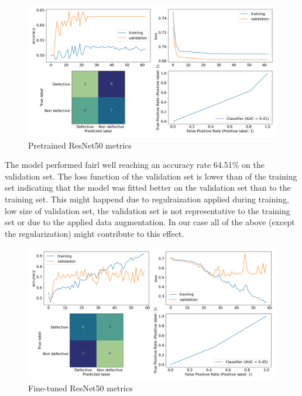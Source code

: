 \documentclass[10pt, final]{article}
\begin{document}
\begin{figure}[!ht]
	\centering
	\includegraphics[width=\textwidth]{./tex_graphs/metrics_ResNet50_pretrained.png}
	\caption{Pretrained ResNet50 metrics}
	\label{fig:ResNet50_pretrained_metrics}
\end{figure}

The model performed fairl well reaching an accuracy rate 64.51\% on the validation set.
The loss function of the validation set is lower than of the training set indicating that the model was fitted
better on the validation set than to the training set.
This might happend due to regulraization applied during training, low size of validation set, the validation set
is not representative to the training set or due to the applied data augmentation.
In our case all of the above (except the regularization) might contribute to this effect.

\begin{figure}[!ht]
	\centering
	\includegraphics[width=\textwidth]{./tex_graphs/metrics_ResNet50_pretrained_finetuned.png}
	\caption{Fine-tuned ResNet50 metrics}
	\label{fig:ResNet50_finetuned_metrics}
\end{figure}
\end{document}
